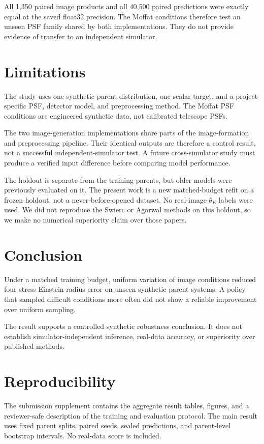 \documentclass[letterpaper]{article}
\begin{document}
All 1,350 paired image products and all 40,500 paired predictions were exactly
equal at the saved float32 precision. The Moffat conditions therefore test an
unseen PSF family shared by both implementations. They do not provide evidence
of transfer to an independent simulator.

\section{Limitations}

The study uses one synthetic parent distribution, one scalar target, and a
project-specific PSF, detector model, and preprocessing method. The Moffat PSF
conditions are engineered synthetic data, not calibrated telescope PSFs.

The two image-generation implementations share parts of the image-formation
and preprocessing pipeline. Their identical outputs are therefore a control
result, not a successful independent-simulator test. A future cross-simulator
study must produce a verified input difference before comparing model
performance.

The holdout is separate from the training parents, but older models were
previously evaluated on it. The present work is a new matched-budget refit on a
frozen holdout, not a never-before-opened dataset. No real-image
$\theta_E$ labels were used. We did not reproduce the Swierc or Agarwal methods
on this holdout, so we make no numerical superiority claim over those papers.

\section{Conclusion}

Under a matched training budget, uniform variation of image conditions reduced
four-stress Einstein-radius error on unseen synthetic parent systems. A policy
that sampled difficult conditions more often did not show a reliable
improvement over uniform sampling.

The result supports a controlled synthetic robustness conclusion. It does not
establish simulator-independent inference, real-data accuracy, or superiority
over published methods.

\section*{Reproducibility}

The submission supplement contains the aggregate result tables, figures, and a
reviewer-safe description of the training and evaluation protocol. The main
result uses fixed parent splits, paired seeds, sealed predictions, and
parent-level bootstrap intervals. No real-data score is included.



\end{document}
